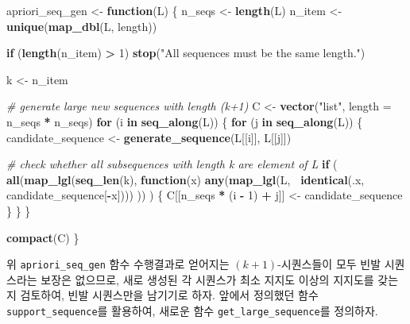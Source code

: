 \documentclass[]{book}
\newenvironment{Shaded}{\begin{snugshade}}{\end{snugshade}}
\newcommand{\CommentTok}[1]{\textcolor[rgb]{0.56,0.35,0.01}{\textit{#1}}}
\newcommand{\ControlFlowTok}[1]{\textcolor[rgb]{0.13,0.29,0.53}{\textbf{#1}}}
\newcommand{\DataTypeTok}[1]{\textcolor[rgb]{0.13,0.29,0.53}{#1}}
\newcommand{\DecValTok}[1]{\textcolor[rgb]{0.00,0.00,0.81}{#1}}
\newcommand{\KeywordTok}[1]{\textcolor[rgb]{0.13,0.29,0.53}{\textbf{#1}}}
\newcommand{\NormalTok}[1]{#1}
\newcommand{\OperatorTok}[1]{\textcolor[rgb]{0.81,0.36,0.00}{\textbf{#1}}}
\newcommand{\StringTok}[1]{\textcolor[rgb]{0.31,0.60,0.02}{#1}}
\begin{document}
\begin{Shaded}
\begin{Highlighting}[]
\NormalTok{apriori_seq_gen <-}\StringTok{ }\ControlFlowTok{function}\NormalTok{(L) \{}
\NormalTok{  n_seqs <-}\StringTok{ }\KeywordTok{length}\NormalTok{(L)}
\NormalTok{  n_item <-}\StringTok{ }\KeywordTok{unique}\NormalTok{(}\KeywordTok{map_dbl}\NormalTok{(L, length))}
  
  \ControlFlowTok{if}\NormalTok{ (}\KeywordTok{length}\NormalTok{(n_item) }\OperatorTok{>}\StringTok{ }\DecValTok{1}\NormalTok{) }\KeywordTok{stop}\NormalTok{(}\StringTok{"All sequences must be the same length."}\NormalTok{)}
  
\NormalTok{  k <-}\StringTok{ }\NormalTok{n_item}
  
  \CommentTok{# generate large new sequences with length (k+1)}
\NormalTok{  C <-}\StringTok{ }\KeywordTok{vector}\NormalTok{(}\StringTok{"list"}\NormalTok{, }\DataTypeTok{length =}\NormalTok{ n_seqs }\OperatorTok{*}\StringTok{ }\NormalTok{n_seqs)}
  \ControlFlowTok{for}\NormalTok{ (i }\ControlFlowTok{in} \KeywordTok{seq_along}\NormalTok{(L)) \{}
    \ControlFlowTok{for}\NormalTok{ (j }\ControlFlowTok{in} \KeywordTok{seq_along}\NormalTok{(L)) \{}
\NormalTok{      candidate_sequence <-}\StringTok{ }\KeywordTok{generate_sequence}\NormalTok{(L[[i]], L[[j]])}
      
      \CommentTok{# check whether all subsequences with length k are element of L}
      \ControlFlowTok{if}\NormalTok{ (}
        \KeywordTok{all}\NormalTok{(}\KeywordTok{map_lgl}\NormalTok{(}\KeywordTok{seq_len}\NormalTok{(k), }\ControlFlowTok{function}\NormalTok{(x) }
          \KeywordTok{any}\NormalTok{(}\KeywordTok{map_lgl}\NormalTok{(L, }\OperatorTok{~}\KeywordTok{identical}\NormalTok{(.x, candidate_sequence[}\OperatorTok{-}\NormalTok{x])))}
\NormalTok{        ))}
\NormalTok{      ) \{}
\NormalTok{        C[[n_seqs }\OperatorTok{*}\StringTok{ }\NormalTok{(i }\OperatorTok{-}\StringTok{ }\DecValTok{1}\NormalTok{) }\OperatorTok{+}\StringTok{ }\NormalTok{j]] <-}\StringTok{ }\NormalTok{candidate_sequence}
\NormalTok{      \}}
\NormalTok{    \}}
\NormalTok{  \}}
  
  \KeywordTok{compact}\NormalTok{(C)}
\NormalTok{\}}
\end{Highlighting}
\end{Shaded}

위 \texttt{apriori\_seq\_gen} 함수 수행결과로 얻어지는 \((k+1)\)-시퀀스들이 모두 빈발 시퀀스라는 보장은 없으므로, 새로 생성된 각 시퀀스가 최소 지지도 이상의 지지도를 갖는지 검토하여, 빈발 시퀀스만을 남기기로 하자. 앞에서 정의했던 함수 \texttt{support\_sequence}를 활용하여, 새로운 함수 \texttt{get\_large\_sequence}를 정의하자.
\end{document}
